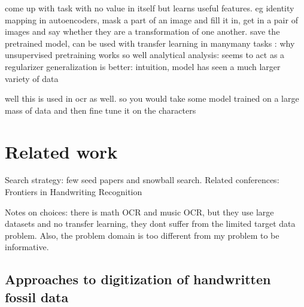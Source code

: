 \documentclass{article}
\begin{document}
come up with task with no value in itself but learns useful features. eg identity mapping in autoencoders,
mask a part of an image and fill it in, get in a pair of images and say whether they are a transformation of one another.
save the pretrained model, can be used with transfer learning in manymany tasks
\cite{erhanWhyDoesUnsupervised2010}: why unsupervised pretraining works so well
analytical analysis: seems to act as a regularizer
generalization is better: intuition, model has seen a much larger variety of data 

well this is used in ocr as well.
so you would take some model trained on a large mass of data and then fine tune it on the characters


\section{Related work}


Search strategy: few seed papers and snowball search. Related conferences: 
Frontiers in Handwriting Recognition

Notes on choices: there is math OCR and music OCR, but they use large datasets and no transfer learning, they dont suffer from the limited target data problem. Also, the problem domain is too different from my problem to be informative.

\subsection{Approaches to digitization of handwritten fossil data}
\end{document}
